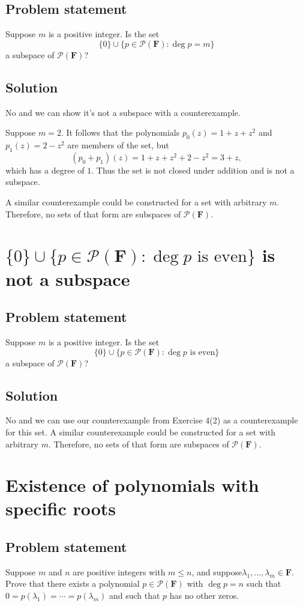 \documentclass{article}
\begin{document}
\subsection*{Problem statement}
Suppose $m$ is a positive integer. 
Is the set
\[\{0\}\cup\{p\in\mathcal{P}(\mathbf{F}):\deg p=m\}\]
a subspace of $\mathcal{P}(\mathbf{F})$?

\subsection*{Solution}
No and we can show it's not a subspace with a counterexample. 

Suppose $m=2$. 
It follows that the polynomials $p_0(z)=1+z+z^2$ and $p_1(z)=2-z^2$ are members of the set, but 
\[(p_0+p_1)(z)=1+z+z^2+2-z^2=3+z,\]
which has a degree of $1$. 
Thus the set is not closed under addition and is not a subspace. 

A similar counterexample could be constructed for a set with arbitrary $m$. 
Therefore, no sets of that form are subspaces of $\mathcal{P}(\mathbf{F})$.

\clearpage

\section{$\{0\}\cup\{p\in\mathcal{P}(\mathbf{F}):\deg p \text{ is even}\}$ is not a subspace}
\subsection*{Problem statement}
Suppose $m$ is a positive integer. 
Is the set
\[\{0\}\cup\{p\in\mathcal{P}(\mathbf{F}):\deg p \text{ is even}\}\]
a subspace of $\mathcal{P}(\mathbf{F})$?

\subsection*{Solution}
No and we can use our counterexample from Exercise 4(2) as a counterexample for this set. 
A similar counterexample could be constructed for a set with arbitrary $m$. 
Therefore, no sets of that form are subspaces of $\mathcal{P}(\mathbf{F})$.

\clearpage

\section{Existence of polynomials with specific roots}
\subsection*{Problem statement}
Suppose $m$ and $n$ are positive integers with $m\leq n$, and suppose\newline $\lambda_1,\ldots,\lambda_m\in\mathbf{F}$. 
Prove that there exists a polynomial $p\in\mathcal{P}(\mathbf{F})$ with $\deg p=n$ such that $0=p(\lambda_1)=\cdots=p(\lambda_m)$ and such that $p$ has no other zeros.
\end{document}
